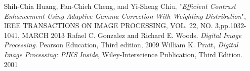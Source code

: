 \documentclass[11pt]{report}
\begin{document}
   
%
\begin{thebibliography}{999}

 Shih-Chia Huang, Fan-Chieh Cheng, and Yi-Sheng Chiu, "\textit{Efficient Contrast Enhancement Using Adaptive Gamma Correction With Weighting Distribution}", IEEE TRANSACTIONS ON IMAGE PROCESSING, VOL. 22, NO. 3,pp.1032-1041, MARCH 2013
 Rafael C. Gonzalez and Richard E. Woods. \textit{Digital Image Processing}. Pearson Education, Third edition, 2009
 William K. Pratt, \textit{Digital Image Processing: PIKS Inside},  Wiley-Interscience Publication, Third Edition.  2001 

\end{thebibliography}
\end{document}
